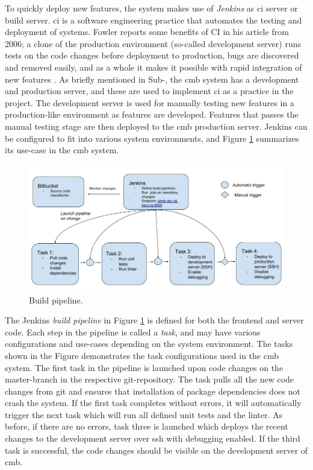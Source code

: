 To quickly deploy new features, the system makes use of \textit{Jenkins} \cite{JENKINS} as \gls{ci} server or build server. \gls{ci} is a software engineering practice that automates the testing and deployment of systems. Fowler reports some benefits of CI in his article from 2006; a clone of the production environment (so-called development server) runs tests on the code changes before deployment to production, bugs are discovered and removed easily, and as a whole it makes it possible with rapid integration of new features \cite{a:F:CI}. As briefly mentioned in Sub-, the \gls{cmb} system has a development and production server, and these are used to implement \gls{ci} as a practice in the project. The development server is used for manually testing new features in a production-like environment as features are developed. Features that passes the manual testing stage are then deployed to the \gls{cmb} production server. Jenkins can be configured to fit into various system environments, and Figure \ref{fig:server-ci} summarizes its use-case in the \gls{cmb} system. \\

\begin{figure}
  \includegraphics[width=1.0\textwidth]{figs/build_pipeline.jpg}
  \caption[Build pipeline.]{Build pipeline.}
  \label{fig:server-ci}
\end{figure}

The Jenkins \textit{build pipeline} in Figure \ref{fig:server-ci} is defined for both the frontend and server code. Each step in the pipeline is called a \textit{task}, and may have various configurations and use-cases depending on the system environment. The tasks shown in the Figure demonstrates the task configurations used in the \gls{cmb} system. The first task in the pipeline is launched upon code changes on the master-branch in the respective git-repository. The task pulls all the new code changes from git and ensures that installation of package dependencies does not crash the system. If the first task completes without errors, it will automatically trigger the next task which will run all defined unit tests and the linter. As before, if there are no errors, task three is launched which deploys the recent changes to the development server over \gls{ssh} with debugging enabled. If the third task is successful, the code changes should be visible on the development server of \gls{cmb}. \\

